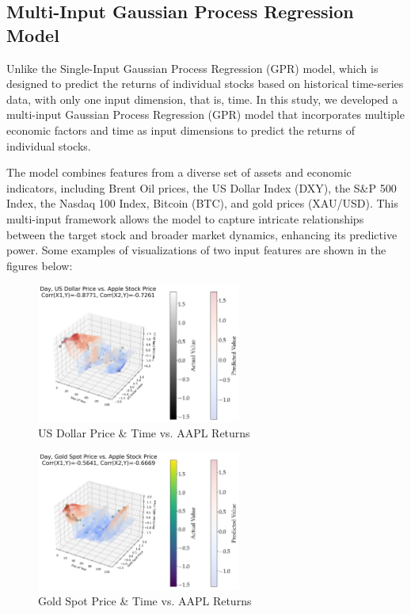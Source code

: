 \subsection{Multi-Input Gaussian Process Regression Model}
Unlike the Single-Input Gaussian Process Regression (GPR) model, which is designed to predict the returns of individual stocks based on historical time-series data, with only one input dimension, that is, time. 
In this study, we developed a multi-input Gaussian Process Regression (GPR) model that incorporates multiple economic factors and time as input dimensions to predict the returns of individual stocks. 

The model combines features from a diverse set of assets and economic indicators, including Brent Oil prices, the US Dollar Index (DXY), the S\&P 500 Index, the Nasdaq 100 Index, Bitcoin (BTC), and gold prices (XAU/USD). This multi-input framework allows the model to capture intricate relationships between the target stock and broader market dynamics, enhancing its predictive power. Some examples of visualizations of two input features are shown in the figures below:
\begin{figure}[htbp]
    \centering
    \includegraphics[width=0.6\textwidth]{figures/2d_AAPL.png}
    \caption{US Dollar Price & Time vs. AAPL Returns}
    \label{fig:2d_aapl}
\end{figure}

\begin{figure}[htbp]
    \centering
    \includegraphics[width=0.6\textwidth]{figures/2d_gold.png}
    \caption{Gold Spot Price & Time vs. AAPL Returns}
    \label{fig:2d_gold}
\end{figure}
